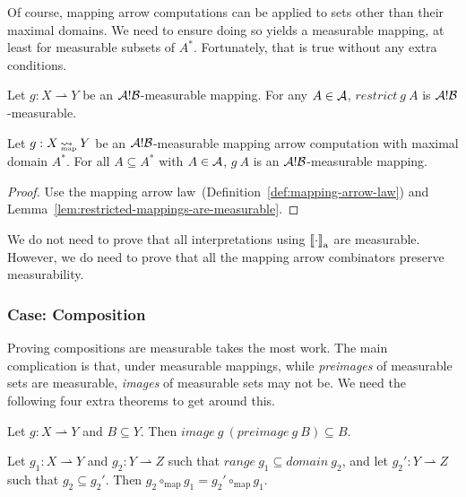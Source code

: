 \documentclass[preprint]{sigplanconf}
\newcommand{\arrow}{\rightsquigarrow}
\newcommand{\pto}{\rightharpoonup}
\newcommand{\gen}{_\mathrm{a}}
\newcommand{\map}{_\mathrm{map}}
\DeclareMathOperator{\mapto}{\arrow_{\mspace{-21mu}\map}}
\begin{document}
Of course, mapping arrow computations can be applied to sets other than their maximal domains.
We need to ensure doing so yields a measurable mapping, at least for measurable subsets of $A^*$.
Fortunately, that is true without any extra conditions.

\begin{lemma}
Let $g : X \pto Y$ be an $\mathcal{A}!\mathcal{B}$-measurable mapping.
For any $A \in \mathcal{A}$, $restrict~g~A$ is $\mathcal{A}!\mathcal{B}$-measurable.
\label{lem:restricted-mappings-are-measurable}
\end{lemma}

\begin{theorem}
Let $g : X \mapto Y$ be an $\mathcal{A}!\mathcal{B}$-measurable mapping arrow computation with maximal domain $A^*$.
For all $A \subseteq A^*$ with $A \in \mathcal{A}$, $g~A$ is an $\mathcal{A}!\mathcal{B}$-measurable mapping.
\label{thm:restricted-computations-are-measurable}
\end{theorem}
\begin{proof}
Use the mapping arrow law~(Definition~\ref{def:mapping-arrow-law}) and Lemma~\ref{lem:restricted-mappings-are-measurable}.
\end{proof}

We do not need to prove that all interpretations using $\meaningof{\cdot}\gen$ are measurable.
However, we do need to prove that all the mapping arrow combinators preserve measurability.

\subsubsection{Case: Composition}

Proving compositions are measurable takes the most work.
The main complication is that, under measurable mappings, while \emph{preimages} of measurable sets are measurable, \emph{images} of measurable sets may not be.
We need the following four extra theorems to get around this.

\begin{lemma}
Let $g : X \pto Y$ and $B \subseteq Y$. Then $image~g~(preimage~g~B) \subseteq B$.
\label{lem:images-of-preimages}
\end{lemma}

\begin{lemma}
Let $g_1 : X \pto Y$ and $g_2 : Y \pto Z$ such that $range~g_1 \subseteq domain~g_2$, and let $g_2' : Y \pto Z$ such that $g_2 \subseteq g_2'$.
Then $g_2 \circ\map g_1 = g_2' \circ\map g_1$.
\label{lem:composition-expansion}
\end{lemma}
\end{document}
